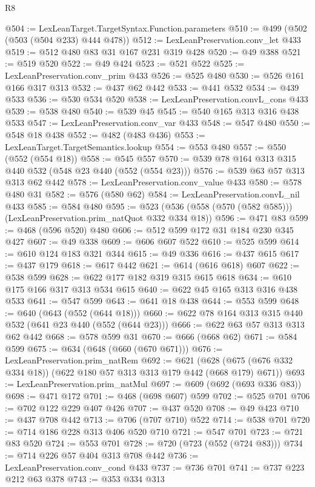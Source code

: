 \begin{lexlean}{R8}
\begin{coremodule}
@504 := LexLeanTarget.TargetSyntax.Function.parameters
@510 := @499 (@502 (@503 (@504 @233) @444 @478))
@512 := LexLeanPreservation.conv_let @433
@519 := @512 @480 @83 @31 @167 @231 @319 @428
@520 := @49 @388
@521 := @519 @520
@522 := @49 @424
@523 := @521 @522
@525 := LexLeanPreservation.conv_prim @433
@526 := @525 @480
@530 := @526 @161 @166 @317 @313
@532 := @437 @62 @442
@533 := @441 @532
@534 := @439 @533
@536 := @530 @534 @520
@538 := LexLeanPreservation.convL_cons @433
@539 := @538 @480
@540 := @539 @45
@545 := @540 @165 @313 @316 @438 @533
@547 := LexLeanPreservation.conv_var @433
@548 := @547 @480
@550 := @548 @18 @438
@552 := @482 (@483 @436)
@553 := LexLeanTarget.TargetSemantics.lookup
@554 := @553 @480
@557 := @550 (@552 (@554 @18))
@558 := @545 @557
@570 := @539 @78 @164 @313 @315 @440 @532 (@548 @23 @440 (@552 (@554 @23)))
@576 := @539 @63 @57 @313 @313 @62 @442
@578 := LexLeanPreservation.conv_value @433
@580 := @578 @480 @31
@582 := @576 (@580 @62)
@584 := LexLeanPreservation.convL_nil @433
@585 := @584 @480
@595 := @523 (@536 (@558 (@570 (@582 @585))) (LexLeanPreservation.prim_natQuot @332 @334 @18))
@596 := @471 @83
@599 := @468 (@596 @520) @480
@606 := @512 @599 @172 @31 @184 @230 @345 @427
@607 := @49 @338
@609 := @606 @607 @522
@610 := @525 @599
@614 := @610 @124 @183 @321 @344
@615 := @49 @336
@616 := @437 @615
@617 := @437 @179
@618 := @617 @442
@621 := @614 (@616 @618) @607
@622 := @538 @599
@628 := @622 @177 @182 @319 @315 @615 @618
@634 := @610 @175 @166 @317 @313 @534 @615
@640 := @622 @45 @165 @313 @316 @438 @533
@641 := @547 @599
@643 := @641 @18 @438
@644 := @553 @599
@648 := @640 (@643 (@552 (@644 @18)))
@660 := @622 @78 @164 @313 @315 @440 @532 (@641 @23 @440 (@552 (@644 @23)))
@666 := @622 @63 @57 @313 @313 @62 @442
@668 := @578 @599 @31
@670 := @666 (@668 @62)
@671 := @584 @599
@675 := @634 (@648 (@660 (@670 @671)))
@676 := LexLeanPreservation.prim_natRem
@692 := @621 (@628 (@675 (@676 @332 @334 @18)) (@622 @180 @57 @313 @313 @179 @442 (@668 @179) @671))
@693 := LexLeanPreservation.prim_natMul
@697 := @609 (@692 (@693 @336 @83))
@698 := @471 @172
@701 := @468 (@698 @607) @599
@702 := @525 @701
@706 := @702 @122 @229 @407 @426
@707 := @437 @520
@708 := @49 @423
@710 := @437 @708 @442
@713 := @706 (@707 @710) @522
@714 := @538 @701
@720 := @714 @186 @228 @313 @406 @520 @710
@721 := @547 @701
@723 := @721 @83 @520
@724 := @553 @701
@728 := @720 (@723 (@552 (@724 @83)))
@734 := @714 @226 @57 @404 @313 @708 @442
@736 := LexLeanPreservation.conv_cond @433
@737 := @736 @701
@741 := @737 @223 @212 @63 @378
@743 := @353 @334 @313

\end{coremodule}
\end{lexlean}
